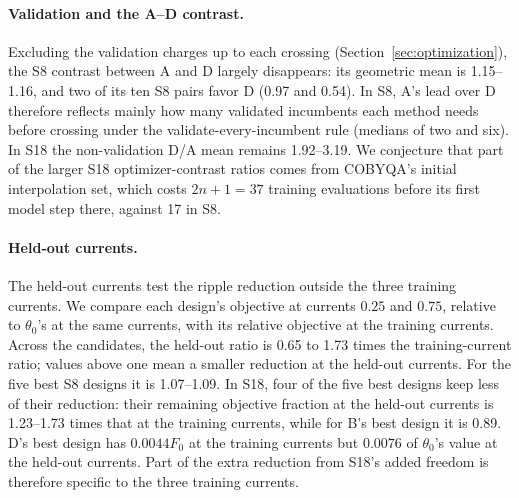 \documentclass{anvil-paper}
\begin{document}
\paragraph{Validation and the A--D contrast.}
Excluding the validation charges up to each crossing
(Section~\ref{sec:optimization}), the S8 contrast between A and D
largely disappears: its geometric mean is 1.15--1.16, and two of its ten S8 pairs favor D
(0.97 and 0.54). In S8, A's lead over D therefore reflects mainly how
many validated incumbents each method needs before crossing under the
validate-every-incumbent rule (medians of two and six). In S18 the
non-validation D/A mean remains 1.92--3.19. We conjecture that part of the larger
S18 optimizer-contrast ratios comes from COBYQA's initial interpolation set, which costs
$2n+1=37$ training evaluations before its first model step there, against
17 in S8.

\paragraph{Held-out currents.}
The held-out currents test the ripple reduction outside the three training
currents. We compare each design's objective at currents $0.25$ and $0.75$,
relative to $\theta_0$'s at the same currents, with its relative objective
at the training currents. Across the candidates, the held-out ratio is 0.65
to 1.73 times the training-current ratio; values above one mean a smaller
reduction at the held-out currents. For the five best S8 designs it
is 1.07--1.09. In S18, four of the five best designs keep less of
their reduction: their remaining objective fraction at the held-out currents
is 1.23--1.73 times that at the training currents, while for B's best
design it is 0.89. D's best design has $0.0044F_0$ at the training currents but
$0.0076$ of $\theta_0$'s value at the held-out currents. Part of the extra
reduction from S18's added freedom is therefore specific to the three
training currents.

\begin{table}[tbp]\centering\small
\caption{Validation charges, repeat~1. ``To crossing'' counts the
validations up to and including the first attaining one, and ``share''
gives the fraction of the time to that target charged to validation, as
medians (ranges) over the method's attained targets and starts. ``Run''
gives the range over starts of the fraction of the whole run's charged time
spent in validation.}
\label{tab:exp2-validation}
\end{table}
\end{document}
